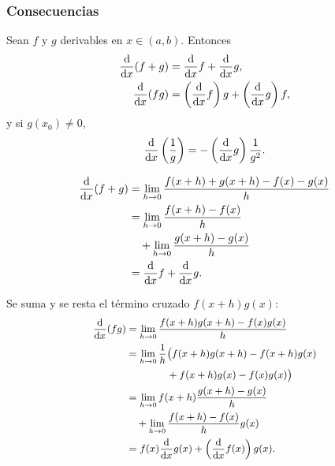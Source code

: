 \subsubsection{Consecuencias}
\label{subsubsec:reglas_derivacion}

Sean $f$ y $g$ derivables en $x\in(a,b)$. Entonces
\begin{align}
  \label{eq:regla_suma}
  \frac{\mathrm{d}}{\mathrm{d}x}(f+g)&=\frac{\mathrm{d}}{\mathrm{d}x}f+\frac{\mathrm{d}}{\mathrm{d}x}g,\\
  \label{eq:regla_producto}
  \frac{\mathrm{d}}{\mathrm{d}x}(fg)&=\left( \frac{\mathrm{d}}{\mathrm{d}x}f \right)g+\left( \frac{\mathrm{d}}{\mathrm{d}x}g \right)f,
\end{align}
y si $g(x_0)\neq 0$,
\begin{equation}
  \label{eq:regla_reciproco}
  \frac{\mathrm{d}}{\mathrm{d}x}\left( \frac{1}{g} \right)=-\left( \frac{\mathrm{d}}{\mathrm{d}x}g \right)\frac{1}{g^2}.
\end{equation}

\begin{demostracion}
  \begin{equation}
    \label{eq:demo_suma}
    \begin{aligned}
      \frac{\mathrm{d}}{\mathrm{d}x}(f+g)
        &=\lim_{h\rightarrow 0}\frac{f(x+h)+g(x+h)-f(x)-g(x)}{h}\\
        &=\lim_{h\rightarrow 0}\frac{f(x+h)-f(x)}{h}\\
        &\quad+\lim_{h\rightarrow 0}\frac{g(x+h)-g(x)}{h}\\
        &=\frac{\mathrm{d}}{\mathrm{d}x}f+\frac{\mathrm{d}}{\mathrm{d}x}g .
    \end{aligned}
  \end{equation}
\end{demostracion}

\begin{demostracion}
  Se suma y se resta el t\'ermino cruzado $f(x+h)g(x)$:
  \begin{equation}
    \label{eq:demo_producto}
    \small
    \begin{aligned}
      \frac{\mathrm{d}}{\mathrm{d}x}(fg)
        &=\lim_{h\rightarrow 0}\frac{f(x+h)g(x+h)-f(x)g(x)}{h}\\
        &=\lim_{h\rightarrow 0}\frac{1}{h}
          \big(f(x+h)g(x+h)-f(x+h)g(x)\\
        &\qquad\qquad+f(x+h)g(x)-f(x)g(x)\big)\\
        &=\lim_{h\rightarrow 0}f(x+h)\frac{g(x+h)-g(x)}{h}\\
        &\quad+\lim_{h\rightarrow 0}\frac{f(x+h)-f(x)}{h}g(x)\\
        &=f(x)\frac{\mathrm{d}}{\mathrm{d}x}g(x)+\left( \frac{\mathrm{d}}{\mathrm{d}x}f(x) \right)g(x).
    \end{aligned}
  \end{equation}
\end{demostracion}

